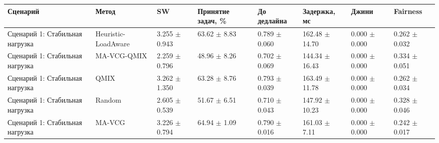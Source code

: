 \begin{tabular}{llllllll}
\toprule
Сценарий & Метод & SW & Принятие задач, \% & До дедлайна & Задержка, мс & Джини & Fairness \\
\midrule
Сценарий 1: Стабильная нагрузка & Heuristic-LoadAware & 3.255 $\pm$ 0.943 & 63.62 $\pm$ 8.83 & 0.789 $\pm$ 0.060 & 162.48 $\pm$ 14.70 & 0.000 $\pm$ 0.000 & 0.262 $\pm$ 0.032 \\
Сценарий 1: Стабильная нагрузка & MA-VCG-QMIX & 2.259 $\pm$ 0.796 & 48.96 $\pm$ 8.26 & 0.702 $\pm$ 0.069 & 144.34 $\pm$ 16.43 & 0.000 $\pm$ 0.000 & 0.334 $\pm$ 0.051 \\
Сценарий 1: Стабильная нагрузка & QMIX & 3.262 $\pm$ 1.350 & 63.28 $\pm$ 8.76 & 0.793 $\pm$ 0.039 & 163.49 $\pm$ 11.78 & 0.000 $\pm$ 0.000 & 0.262 $\pm$ 0.034 \\
Сценарий 1: Стабильная нагрузка & Random & 2.605 $\pm$ 0.539 & 51.67 $\pm$ 6.51 & 0.710 $\pm$ 0.043 & 147.92 $\pm$ 10.23 & 0.000 $\pm$ 0.000 & 0.328 $\pm$ 0.046 \\
Сценарий 1: Стабильная нагрузка & MA-VCG & 3.226 $\pm$ 0.794 & 64.94 $\pm$ 1.09 & 0.790 $\pm$ 0.016 & 161.03 $\pm$ 7.11 & 0.000 $\pm$ 0.000 & 0.242 $\pm$ 0.017 \\
\bottomrule
\end{tabular}
